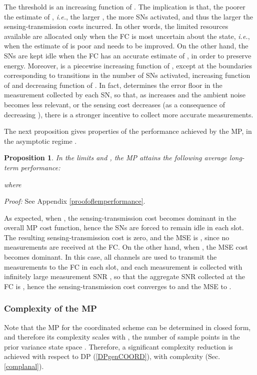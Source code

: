 \documentclass[10pt,twocolumn,twoside]{IEEEtran}
\newtheorem{propos}{Proposition}
\theoremstyle{plain}
\begin{document}
The threshold  is an increasing function of .
The implication is that, the poorer the estimate of , \emph{i.e.}, the larger , the more SNs activated,
and thus the larger the sensing-transmission costs incurred. 
In other words, the limited resources available are allocated only when the FC is most uncertain about the state, \emph{i.e.}, when the estimate of
  is poor and needs to be improved. On the other hand, the SNs are kept idle when the FC has an accurate estimate of , in order to preserve energy.
Moreover,  is a piecewise increasing function of , except at the boundaries  corresponding to transitions in the number of SNs activated, increasing function of  and decreasing function of .
In fact,  determines the error floor in the measurement collected by each SN, so that,
as  increases and the ambient noise becomes less relevant,
or the sensing cost decreases (as a consequence of decreasing ),
 there is a stronger incentive to collect more accurate measurements.

The next proposition gives properties of the performance achieved by the MP, in the asymptotic regime .
\begin{propos}
\label{lemperformance}
In the limits  and ,
 the MP attains the following average long-term performance:

where

\end{propos}
\noindent\emph{Proof:}
See  Appendix \ref{proofoflemperformance}.
\hfill\QED

\noindent As expected, when , the sensing-transmission cost becomes dominant in the overall MP cost function,
hence the SNs are forced to remain idle in each slot. The resulting sensing-transmission cost is zero, and the MSE is , since no measurements are received at the FC.
On the other hand, when , the MSE cost becomes dominant. In this case, all  channels are used to transmit 
the measurements to the FC in each slot, and each measurement is collected with infinitely large measurement SNR , so that the aggregate SNR collected at the
FC is , hence the sensing-transmission cost converges to  and the MSE  to 
\cite[Prop.~7]{MichelusiP1}.

\subsubsection{Complexity of the MP}
\label{complmpcoord}
Note that the MP for the coordinated scheme can be determined in closed form, and therefore its complexity scales with , the number of 
sample points in the prior variance state space .
Therefore, a significant complexity reduction is achieved with respect to DP (\ref{DPgenCOORD}),
with complexity   (Sec. \ref{complanal}).
\end{document}
